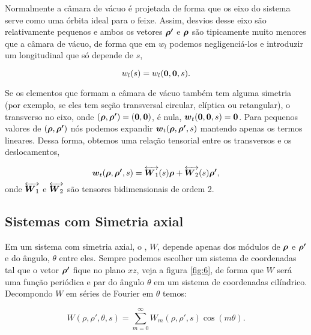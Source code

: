 Normalmente a câmara de vácuo é projetada de forma que os eixo do sistema serve como uma órbita ideal para o feixe. Assim, desvios desse eixo são relativamente pequenos e ambos os vetores $\boldsymbol{\rho'}$ e $\boldsymbol{\rho}$ são tipicamente muito menores que a câmara de vácuo, de forma que em $w_l$ podemos negligenciá-los e introduzir um  longitudinal que só depende de $s$,

\begin{equation}
	w_l(s) = w_l(\boldsymbol{0},\boldsymbol{0},s).
\end{equation}

Se os elementos que formam a câmara de vácuo também tem alguma simetria (por exemplo, se eles tem seção transversal circular, elíptica ou retangular), o  transverso no eixo, onde $(\boldsymbol{\rho},\boldsymbol{\rho'}) = (\boldsymbol{0},\boldsymbol{0})$, é nula, $\boldsymbol{w}_t(\boldsymbol{0},\boldsymbol{0},s)=\boldsymbol{0}$. Para pequenos valores de $(\boldsymbol{\rho},\boldsymbol{\rho'})$ nós podemos expandir $\boldsymbol{w}_t(\boldsymbol{\rho},\boldsymbol{\rho'},s)$ mantendo apenas os termos lineares. Dessa forma, obtemos uma relação tensorial entre os  transversos e os deslocamentos,

\begin{equation}
	\boldsymbol{w}_t(\boldsymbol{\rho},\boldsymbol{\rho'},s) = \overleftrightarrow{\boldsymbol{W}_1}(s)\boldsymbol{\rho} +
    										 \overleftrightarrow{\boldsymbol{W}_2}(s)\boldsymbol{\rho'},
\end{equation}
onde $\overleftrightarrow{\boldsymbol{W}_1}$ e $\overleftrightarrow{\boldsymbol{W}_2}$ são tensores bidimensionais de ordem 2. 

\subsection{Sistemas com Simetria axial}

Em um sistema com simetria axial, o , $W$, depende apenas dos módulos de $\boldsymbol{\rho}$ e $\boldsymbol{\rho'}$ e do ângulo, $\theta$ entre eles. Sempre podemos escolher um sistema de coordenadas tal que o vetor $\boldsymbol{\rho'}$ fique no plano $xz$, veja a figura \ref{fig:6}, de forma que $W$ será uma função periódica e par  do ângulo $\theta$ em um sistema de coordenadas cilíndrico. Decompondo $W$ em séries de Fourier em $\theta$ temos:

\begin{equation}
	W(\rho,\rho',\theta,s) = \sum_{m=0}^\infty W_m (\rho,\rho',s) \cos(m\theta).
\end{equation}


